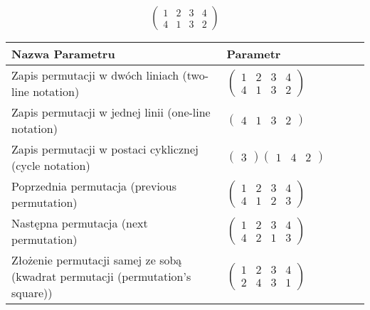 \documentclass[12pt]{article}
\begin{document}
\subsection{}
\begin{center}
\[
\begin{pmatrix}
	1 & 2 & 3 & 4 \\ 
	4 & 1 & 3 & 2 
\end{pmatrix}
\]

\begin{tabular}{|m{0.6\linewidth}|m{0.4\linewidth}|}
	\hline
	Nazwa Parametru & Parametr \\
	\hline
	Zapis permutacji w dwóch liniach (two-line notation) & $\begin{pmatrix} 1 & 2 & 3 & 4 \\ 
4 & 1 & 3 & 2 \end{pmatrix}$ \\ 
	\hline
	Zapis permutacji w jednej linii (one-line notation) & $\begin{pmatrix} 4 & 1 & 3 & 2 \end{pmatrix}$ \\ 
	\hline
	Zapis permutacji w postaci cyklicznej (cycle notation) & $\begin{pmatrix} 3 \end{pmatrix} \begin{pmatrix} 1 & 4 & 2 \end{pmatrix} $ \\ 
	\hline
	Poprzednia permutacja (previous permutation) & $\begin{pmatrix} 1 & 2 & 3 & 4 \\ 
4 & 1 & 2 & 3 \end{pmatrix}$ \\ 
	\hline
	Następna permutacja (next permutation) & $\begin{pmatrix} 1 & 2 & 3 & 4 \\ 
4 & 2 & 1 & 3 \end{pmatrix}$ \\ 
	\hline
	Złożenie permutacji samej ze sobą (kwadrat permutacji (permutation's square)) & $\begin{pmatrix} 1 & 2 & 3 & 4 \\ 
2 & 4 & 3 & 1 \end{pmatrix}$ \\ 
	\hline
\end{tabular}
\end{center}
\end{document}
